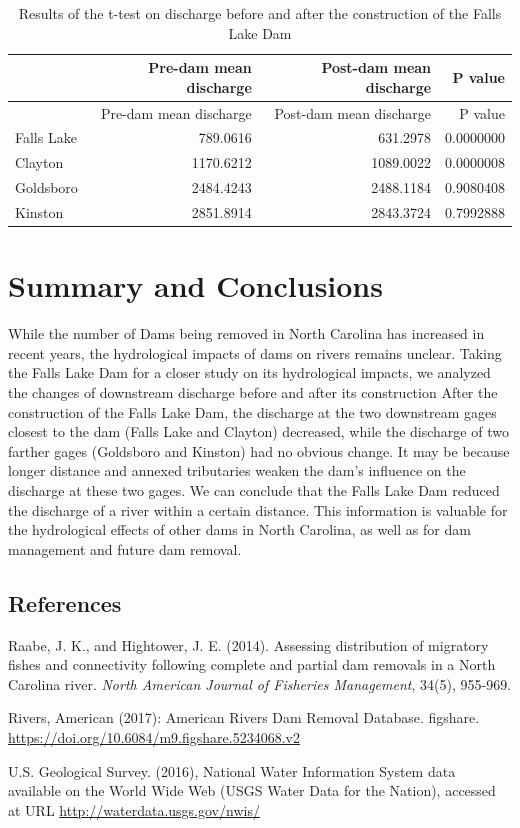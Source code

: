 \documentclass[
  12pt,
]{article}
\begin{document}
\begin{longtable}[]{@{}lrrr@{}}
\caption{Results of the t-test on discharge before and after the
construction of the Falls Lake Dam}\tabularnewline
\toprule
& Pre-dam mean discharge & Post-dam mean discharge & P
value\tabularnewline
\midrule
\endfirsthead
\toprule
& Pre-dam mean discharge & Post-dam mean discharge & P
value\tabularnewline
\midrule
\endhead
Falls Lake & 789.0616 & 631.2978 & 0.0000000\tabularnewline
Clayton & 1170.6212 & 1089.0022 & 0.0000008\tabularnewline
Goldsboro & 2484.4243 & 2488.1184 & 0.9080408\tabularnewline
Kinston & 2851.8914 & 2843.3724 & 0.7992888\tabularnewline
\bottomrule
\end{longtable}

\newpage

\hypertarget{summary-and-conclusions}{%
\section{Summary and Conclusions}\label{summary-and-conclusions}}

While the number of Dams being removed in North Carolina has increased
in recent years, the hydrological impacts of dams on rivers remains
unclear. Taking the Falls Lake Dam for a closer study on its
hydrological impacts, we analyzed the changes of downstream discharge
before and after its construction After the construction of the Falls
Lake Dam, the discharge at the two downstream gages closest to the dam
(Falls Lake and Clayton) decreased, while the discharge of two farther
gages (Goldsboro and Kinston) had no obvious change. It may be because
longer distance and annexed tributaries weaken the dam's influence on
the discharge at these two gages. We can conclude that the Falls Lake
Dam reduced the discharge of a river within a certain distance. This
information is valuable for the hydrological effects of other dams in
North Carolina, as well as for dam management and future dam removal.

\newpage

\hypertarget{references}{%
\subsection{References}\label{references}}

Raabe, J. K., and Hightower, J. E. (2014). Assessing distribution of
migratory fishes and connectivity following complete and partial dam
removals in a North Carolina river. \emph{North American Journal of
Fisheries Management}, 34(5), 955-969.

Rivers, American (2017): American Rivers Dam Removal Database. figshare.
\url{https://doi.org/10.6084/m9.figshare.5234068.v2}

U.S. Geological Survey. (2016), National Water Information System data
available on the World Wide Web (USGS Water Data for the Nation),
accessed at URL \url{http://waterdata.usgs.gov/nwis/}
\end{document}
